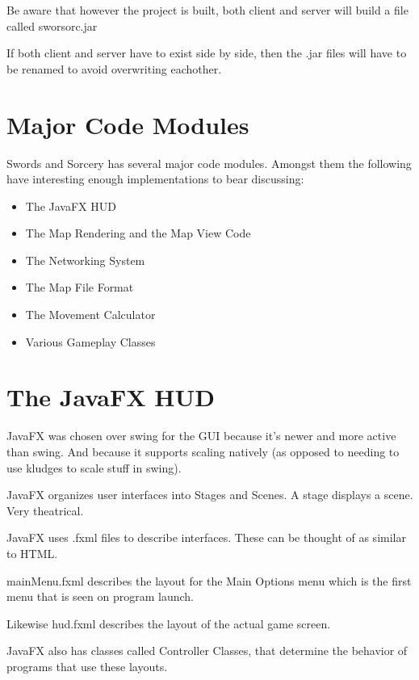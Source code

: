 \documentclass[12pt,a4paper]{article}
\begin{document}
Be aware that however the project is built, 
both client and server will build a file called sworsorc.jar

If both client and server have to exist side by side,
then the .jar files will have to be renamed to avoid overwriting eachother.

\section{Major Code Modules}
Swords and Sorcery has several major code modules. Amongst them the following
have interesting enough implementations to bear discussing:

\begin{itemize}
	\item The JavaFX HUD	
	\item The Map Rendering and the Map View Code
	\item The Networking System
	\item The Map File Format
	\item The Movement Calculator
    \item Various Gameplay Classes
\end{itemize}

\section{The JavaFX HUD}
JavaFX was chosen over swing for the GUI because it's newer and more active
than swing. And because it supports scaling natively (as opposed to needing to
use kludges to scale stuff in swing).

JavaFX organizes user interfaces into Stages and Scenes. A stage displays a 
scene. Very theatrical.

JavaFX uses .fxml files to describe interfaces. These can be thought of as
similar to HTML.

mainMenu.fxml describes the layout for the Main Options menu which is the first
menu that is seen on program launch.

Likewise hud.fxml describes the layout of the actual game screen.

JavaFX also has classes called Controller Classes, that determine the behavior
of programs that use these layouts.
\end{document}
